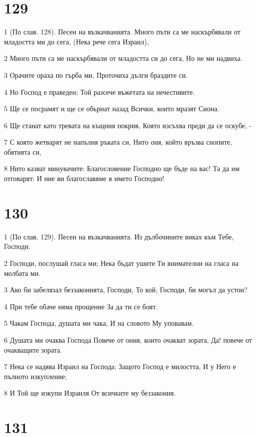 \chapter{129}

\par 1 (По слав. 128). Песен на възкачванията. Много пъти са ме наскърбявали от младостта ми до сега, (Нека рече сега Израил),
\par 2 Много пъти са ме наскърбявали от младостта си до сега, Но не ми надвиха.
\par 3 Орачите ораха по гърба ми, Проточиха дълги браздите си.
\par 4 Но Господ е праведен; Той разсече въжетата на нечестивите.
\par 5 Ще се посрамят и ще се обърнат назад Всички, които мразят Сиона.
\par 6 Ще станат като тревата на къщния покрив, Която изсъхва преди да се оскубе, -
\par 7 С която жетварят не напълня ръката си, Нито оня, който връзва снопите, обятията си,
\par 8 Нито казват минувачите: Благословение Господно ще бъде на вас! Та да им отговарят: И ние ви благославяме в името Господно!

\chapter{130}

\par 1 (По слав. 129). Песен на възкачванията. Из дълбочините виках към Тебе, Господи.
\par 2 Господи, послушай гласа ми; Нека бъдат ушите Ти внимателни на гласа на молбата ми.
\par 3 Ако би забелязал беззаконията, Господи, То кой, Господи, би могъл да устои?
\par 4 При тебе обаче няма прощение За да ти се боят.
\par 5 Чакам Господа, душата ми чака, И на словото Му уповавам.
\par 6 Душата ми очаква Господа Повече от ония, които очакват зората, Да! повече от очакващите зората.
\par 7 Нека се надява Израил на Господа; Защото Господ е милостта, И у Него е пълното изкупление;
\par 8 И Той ще изкупи Израиля От всичките му беззакония.

\chapter{131}

